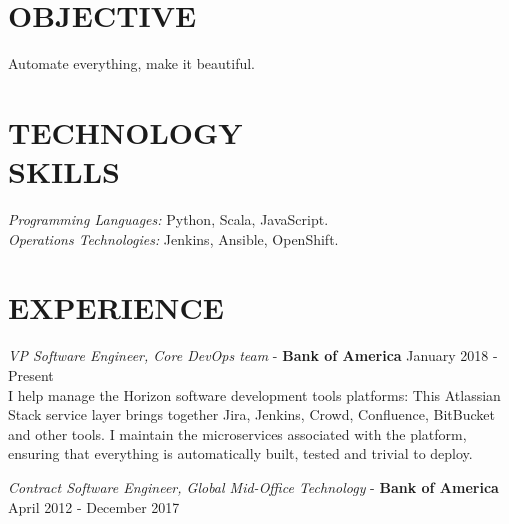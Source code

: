 \documentclass[margin, 10pt]{res} %
\begin{document}
    \begin{resume}


        \section{OBJECTIVE}

        Automate everything, make it beautiful.


        \section{TECHNOLOGY \\ SKILLS}

        {\sl Programming Languages:} Python, Scala, JavaScript. \\
        {\sl Operations Technologies:} Jenkins, Ansible, OpenShift. \\


        \section{EXPERIENCE}

        {\sl VP Software Engineer, Core DevOps team} - \textbf{Bank of America} \hfill January 2018 - Present \\

        I help manage the Horizon software development tools platforms: This Atlassian Stack service layer
        brings together Jira, Jenkins, Crowd, Confluence, BitBucket and other tools. I maintain the
        microservices associated with the platform, ensuring that everything is automatically built,
        tested and trivial to deploy.


        {\sl Contract Software Engineer, Global Mid-Office Technology} - \textbf{Bank of America} \hfill April 2012 - December 2017 \\


\end{resume}
\end{document}

